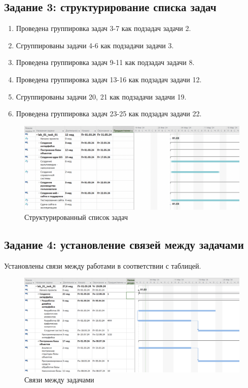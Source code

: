 \newpage

\subsection*{Задание 3: структурирование списка задач}

\begin{enumerate}
    \item Проведена группировка задач 3-7 как подзадач задачи 2.
    \item Сгруппированы задачи 4-6 как подзадачи задачи 3.
    \item Проведена группировка задач 9-11 как подзадач задачи 8.
    \item Проведена группировка задач 13-16 как подзадач задачи 12.
    \item Сгруппированы задачи 20, 21 как подзадачи задачи 19.
    \item Проведена группировка задач 23-25 как подзадач задачи 22.
\end{enumerate}

\begin{figure}[h!]
	\begin{center}
		\includegraphics[scale=0.34]{inc/img/p_11.png}
	\end{center}
	\captionsetup{justification=centering}
	\caption{Структурированный список задач}
	\label{fig:u3}
\end{figure}

\subsection*{Задание 4: установление связей между задачами}

Установлены связи между работами в соответствии с таблицей.

\begin{figure}[h!]
	\begin{center}
		\includegraphics[scale=0.34]{inc/img/p_12.png}
	\end{center}
	\captionsetup{justification=centering}
	\caption{Связи между задачами}
	\label{fig:u3}
\end{figure}


